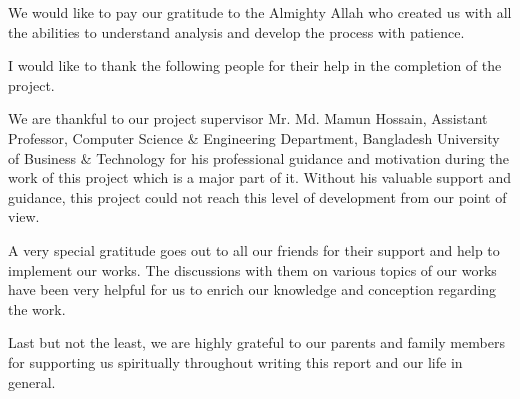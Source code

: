 
We would like to pay our gratitude to the Almighty Allah who created us with all the abilities to understand analysis and develop the process with patience.

I would like to thank the following people for their help in the completion of the project.

We are thankful to our project supervisor Mr. Md. Mamun Hossain, Assistant Professor, Computer Science \& Engineering Department, Bangladesh University of Business \& Technology for his professional guidance and motivation during the work of this project which is a major part of it. Without his valuable support and guidance, this project could not reach this level of development from our point of view.

A very special gratitude goes out to all our friends for their support and help to implement our works. The discussions with them on various topics of our works have been very helpful for us to enrich our knowledge and conception regarding the work.

Last but not the least, we are highly grateful to our parents and family members for supporting us spiritually throughout writing this report and our life in general.

\endinput

